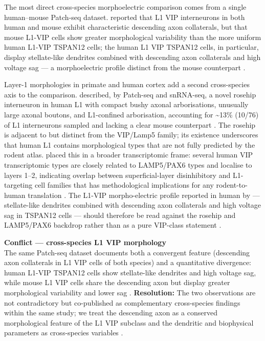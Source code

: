 \documentclass[11pt]{article}
\begin{document}
The most direct cross-species morphoelectric comparison comes from a single human--mouse Patch-seq dataset. \citet{Chartrand2023} reported that L1 VIP interneurons in both human and mouse exhibit characteristic descending axon collaterals, but that mouse L1-VIP cells show greater morphological variability than the more uniform human L1-VIP TSPAN12 cells; the human L1 VIP TSPAN12 cells, in particular, display stellate-like dendrites combined with descending axon collaterals and high voltage sag --- a morphoelectric profile distinct from the mouse counterpart \citep{Chartrand2023, Boldog2018, Hodge2019, Lee2023a}.

Layer-1 morphologies in primate and human cortex add a second cross-species axis to the comparison. \citet{Boldog2018} described, by Patch-seq and snRNA-seq, a novel rosehip interneuron in human L1 with compact bushy axonal arborisations, unusually large axonal boutons, and L1-confined arborisation, accounting for {\textasciitilde}13\% (10/76) of L1 interneurons sampled and lacking a clear mouse counterpart \citep{Boldog2018, Hodge2019, Chartrand2023, Lee2023a}. The rosehip is adjacent to but distinct from the VIP/Lamp5 family; its existence underscores that human L1 contains morphological types that are not fully predicted by the rodent atlas. \citet{Hodge2019} placed this in a broader transcriptomic frame: several human VIP transcriptomic types are closely related to LAMP5/PAX6 types and localise to layers 1--2, indicating overlap between superficial-layer disinhibitory and L1-targeting cell families that has methodological implications for any rodent-to-human translation \citep{Hodge2019, Boldog2018, Chartrand2023, Lee2023a}. The L1-VIP morpho-electric profile reported in human by \citet{Chartrand2023} --- stellate-like dendrites combined with descending axon collaterals and high voltage sag in TSPAN12 cells --- should therefore be read against the rosehip and LAMP5/PAX6 backdrop rather than as a pure VIP-class statement \citep{Chartrand2023, Boldog2018, Hodge2019, Lee2023a}.

\begin{framed}
\textbf{Conflict --- cross-species L1 VIP morphology}\\
The same Patch-seq dataset \citep{Chartrand2023} documents both a convergent feature (descending axon collaterals in L1 VIP cells of both species) and a quantitative divergence: human L1-VIP TSPAN12 cells show stellate-like dendrites and high voltage sag, while mouse L1 VIP cells share the descending axon but display greater morphological variability and lower sag \citep{Chartrand2023}. \textbf{Resolution:} The two observations are not contradictory but co-published as complementary cross-species findings within the same study; we treat the descending axon as a conserved morphological feature of the L1 VIP subclass and the dendritic and biophysical parameters as cross-species variables \citep{Chartrand2023, Hodge2019, Boldog2018, Lee2023a}.
\end{framed}
\end{document}
